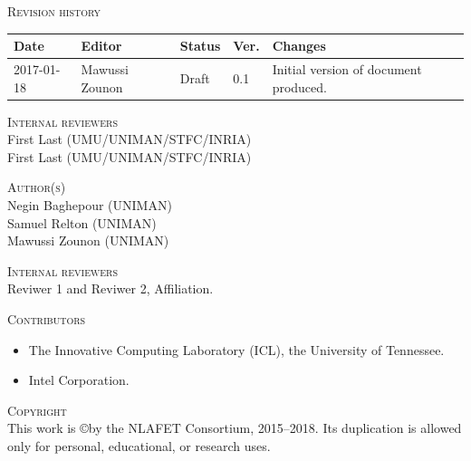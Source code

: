 \documentclass[a4paper,12pt]{article}
\begin{document}
\vspace{2em}


\noindent
\textsc{Revision history}\\[1em]
\begin{tabularx}{\linewidth}{@{}|l|l|l|l|X|}
  \hline
  \rowcolor{orange}
  \bf Date & \bf Editor & \bf Status & \bf Ver. & \bf Changes \\
  \hline
  2017-01-18 & Mawussi Zounon & Draft & 0.1 & Initial version of
                                             document produced. \\
  \hline
\end{tabularx}


\vspace{2em}

\noindent
\textsc{Internal reviewers}\\[1em]
First Last (UMU/UNIMAN/STFC/INRIA)\\
First Last (UMU/UNIMAN/STFC/INRIA)

\vspace{2em}



\noindent
\textsc{Author(s)}\\[1em]

Negin Baghepour (UNIMAN)\\
Samuel Relton (UNIMAN)\\
Mawussi Zounon (UNIMAN)
\vspace{2em}



\noindent
\textsc{Internal reviewers}\\[1em]
Reviwer 1 and Reviwer 2, Affiliation.\\

\vspace{2em}

\noindent
\textsc{Contributors}\\[1em]

\begin{itemize}
\item The Innovative Computing Laboratory (ICL), the University of Tennessee.
\item Intel Corporation.
\end{itemize}

\vspace{2em}

\noindent
\textsc{Copyright}\\[1em]
This work is \copyright by the NLAFET Consortium, 2015--2018.
Its duplication is allowed only for personal, educational, or research uses.
\end{document}
